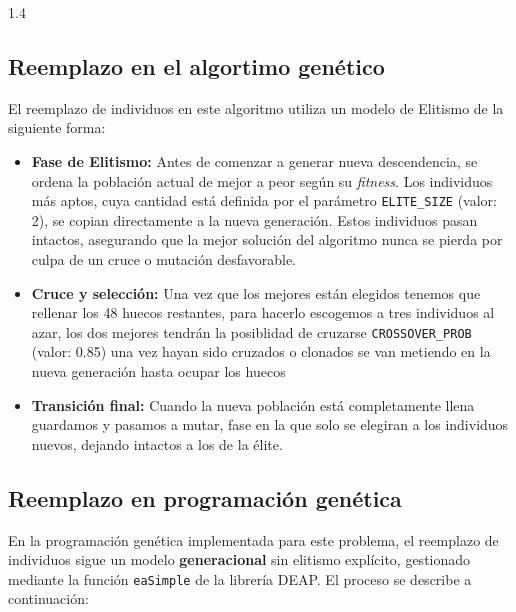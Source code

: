 \documentclass{article}
\begin{document}
\begin{spacing}{1.4}
\subsection{Reemplazo en el algortimo genético}
El reemplazo de individuos en este algoritmo utiliza un modelo de Elitismo de la siguiente forma:
\begin{itemize}
  \item \textbf{Fase de Elitismo:} Antes de comenzar a generar nueva descendencia, se ordena la población actual de mejor a peor según su \textit{fitness}. Los individuos
  más aptos, cuya cantidad está definida por el parámetro \texttt{ELITE\_SIZE} (valor: 2),
  se copian directamente a la nueva generación. Estos individuos pasan intactos, asegurando que la mejor solución del algoritmo nunca se pierda por culpa
  de un cruce o mutación desfavorable.
  \item \textbf{Cruce y selección:}  Una vez que los mejores están elegidos tenemos que rellenar los 48 huecos restantes, para hacerlo escogemos a tres individuos al azar,
  los dos mejores tendrán la posiblidad de cruzarse \texttt{CROSSOVER\_PROB} (valor: 0.85) una vez hayan sido cruzados o clonados se van metiendo en la nueva generación hasta ocupar los huecos
  \item \textbf{Transición final:} Cuando la nueva población está completamente llena guardamos y pasamos a mutar, fase en la que solo se elegiran a los individuos nuevos, dejando intactos
  a los de la élite.
\end{itemize}

\subsection{Reemplazo en programación genética}

En la programación genética implementada para este problema, el reemplazo de individuos sigue un modelo \textbf{generacional} sin elitismo explícito, gestionado mediante la función \texttt{eaSimple} de la librería DEAP. El proceso se describe a continuación:


\end{spacing}
\end{document}
